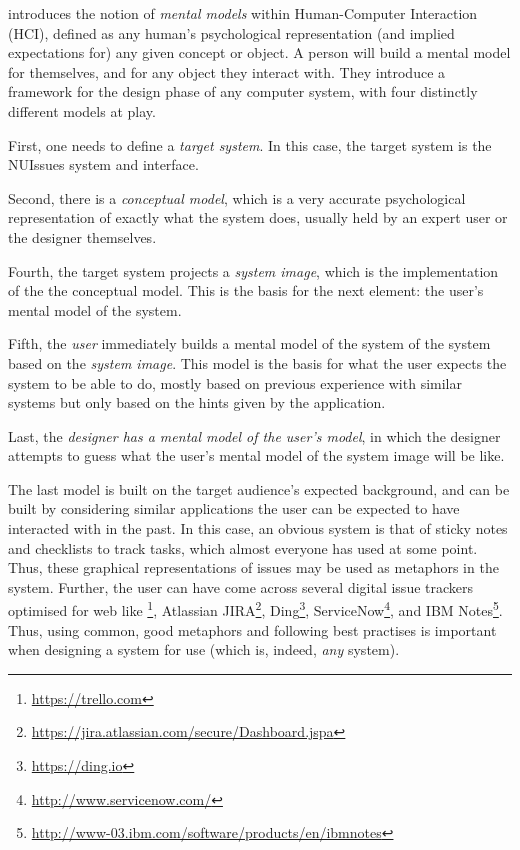 \textcite{wilson-rutherford:mental-models-theory-and-application-in-human-factors:1989} introduces the notion of \textit{mental models} within Human-Computer Interaction (HCI), defined as any human's psychological representation (and implied expectations for) any given concept or object. A person will build a mental model for themselves, and for any object they interact with. They introduce a framework for the design phase of any computer system, with four distinctly different models at play.

First, one needs to define a \textit{target system}. In this case, the target system is the NUIssues system and interface.

Second, there is a \textit{conceptual model}, which is a very accurate psychological representation of exactly what the system does, usually held by an expert user or the designer themselves.

Fourth, the target system projects a \textit{system image}, which is the implementation of the the conceptual model. This is the basis for the next element: the user's mental model of the system.

Fifth, the \textit{user} immediately builds a mental model of the system of the system based on the \textit{system image}. This model is the basis for what the user expects the system to be able to do, mostly based on previous experience with similar systems but only based on the hints given by the application.

Last, the \textit{designer has a mental model of the user's model}, in which the designer attempts to guess what the user's mental model of the system image will be like.

The last model is built on the target audience's expected background, and can be built by considering similar applications the user can be expected to have interacted with in the past. In this case, an obvious system is that of sticky notes and checklists to track tasks, which almost everyone has used at some point. Thus, these graphical representations of issues may be used as metaphors in the system. Further, the user can have come across several digital issue trackers optimised for web like \footnote{\url{https://trello.com}}, Atlassian JIRA\footnote{\url{https://jira.atlassian.com/secure/Dashboard.jspa}}, Ding\footnote{\url{https://ding.io}}, ServiceNow\footnote{\url{http://www.servicenow.com/}}, and IBM Notes\footnote{\url{http://www-03.ibm.com/software/products/en/ibmnotes}}. Thus, using common, good metaphors and following best practises is important when designing a system for use (which is, indeed, \textit{any} system).


